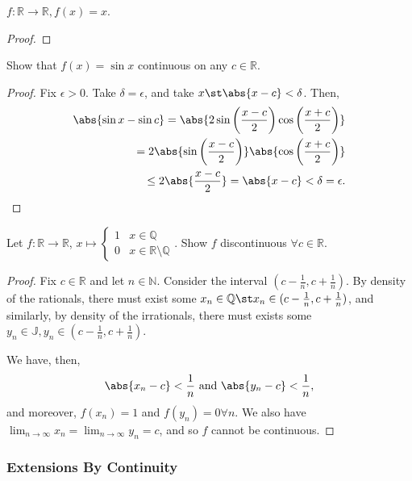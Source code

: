 \documentclass[12pt]{article}
\begin{document}
\begin{example}
  $f: \mathbb{R} \to \mathbb{R}, f(x) = x$.
  \begin{proof}
  \end{proof}
\end{example}

\begin{example}[$f(x)  = \sin x$]
  Show that $f(x) = \sin x$ continuous on any $c \in \mathbb{R}$.
  \begin{proof}
    Fix $\epsilon > 0$. Take $\delta = \epsilon$, and take $x \st \abs{x - c} < \delta$. Then, \begin{align*}
      \abs{\sin x - \sin c} = \abs{2 \sin \left(\frac{x - c}{2}\right) \cos \left(\frac{x+c}{2} \right)}\\
      = 2 \abs{\sin \left(\frac{x - c}{2}\right)}\abs{\cos \left(\frac{x+c}{2} \right)}\\
      \leq 2\abs{\frac{x-c}{2}} = \abs{x - c} < \delta = \epsilon.
    \end{align*}
  \end{proof}
\end{example}

\begin{example}
  Let $f: \mathbb{R} \to \mathbb{R}$, $x\mapsto\begin{cases}
    1 & x \in \mathbb{Q}\\
    0 & x \in \mathbb{R}\setminus\mathbb{Q}
  \end{cases}$. Show $f$ discontinuous $\forall c \in \mathbb{R}$.
  \begin{proof}
    Fix $c \in \mathbb{R}$ and let $n \in \mathbb{N}$. Consider the interval $(c - \frac{1}{n}, c + \frac{1}{n})$. By density of the rationals, there must exist some $x_n \in \mathbb{Q} \st x_n \in (c - \frac{1}{n}, c + \frac{1}{n})$, and similarly, by density of the irrationals, there must exists some $y_n \in \mathbb{J}, y_n \in (c - \frac{1}{n}, c + \frac{1}{n})$.

    We have, then, \[
    \abs{x_n - c}  < \frac{1}{n} \text{ and } \abs{y_n - c} < \frac{1}{n}, 
    \]
    and moreover, $f(x_n) = 1$ and $f(y_n) = 0 \forall n$. We also have $\lim_{n\to\infty} x_n = \lim_{n\to\infty} y_n = c$, and so $f$ cannot be continuous.
  \end{proof}
\end{example}

\subsubsection{Extensions By Continuity}
\end{document}
